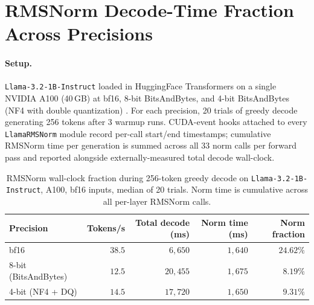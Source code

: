\documentclass{article}
\begin{document}
\section{RMSNorm Decode-Time Fraction Across Precisions}\label{app:rmsnorm-fraction}

\paragraph{Setup.} \texttt{Llama-3.2-1B-Instruct} loaded in HuggingFace Transformers on a single NVIDIA A100 (40\,GB) at bf16, 8-bit BitsAndBytes, and 4-bit BitsAndBytes (NF4 with double quantization) \citep{bitsandbytes}. For each precision, 20 trials of greedy decode generating 256 tokens after 3 warmup runs. CUDA-event hooks attached to every \texttt{LlamaRMSNorm} module record per-call start/end timestamps; cumulative RMSNorm time per generation is summed across all 33 norm calls per forward pass and reported alongside externally-measured total decode wall-clock.

\begin{table}[h!] \centering
\caption{RMSNorm wall-clock fraction during 256-token greedy decode on \texttt{Llama-3.2-1B-Instruct}, A100, bf16 inputs, median of 20 trials. Norm time is cumulative across all per-layer RMSNorm calls.}
\label{tab:rmsnorm-fraction}
\begin{tabular}{l r r r r}
\hline
Precision & Tokens/s & Total decode (ms) & Norm time (ms) & Norm fraction \\
\hline
bf16                  & $38.5$ & $6{,}650$  & $1{,}640$ & $\mathbf{24.62\%}$ \\
8-bit (BitsAndBytes)  & $12.5$ & $20{,}455$ & $1{,}675$ & $8.19\%$ \\
4-bit (NF4 + DQ)      & $14.5$ & $17{,}720$ & $1{,}650$ & $9.31\%$ \\
\hline
\end{tabular}
\end{table}
\end{document}
